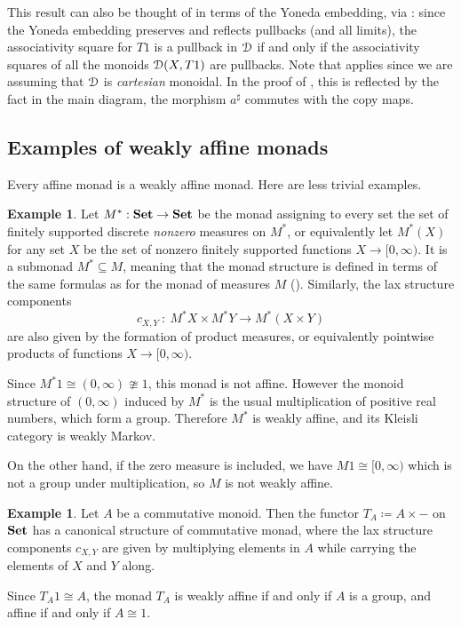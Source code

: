 \documentclass[a4paper,UKenglish,numberwithinsect,cleveref, autoref, thm-restate]{lipics-v2021}
\theoremstyle{plain} %
\theoremstyle{definition} %
\newtheorem{myexample}[mytheorem]{Example}
\begin{document}
This result can also be thought of in terms of the Yoneda embedding, via : since the Yoneda embedding preserves and reflects pullbacks (and all limits), the associativity square for $T1$ is a pullback in $\mathcal{D}$ if and only if the associativity squares of all the monoids $\mathcal{D}(X,T1)$ are pullbacks.
Note that  applies since we are assuming that $\mathcal{D}$ is \emph{cartesian} monoidal. In the proof of , this is reflected by the fact in the main diagram, the morphism $a^\sharp$ commutes with the copy maps. 


\subsection{Examples of weakly affine monads} 
\label{secexamples}

Every affine monad is a weakly affine monad. Here are less trivial examples.

\begin{myexample}
    \label{ex:nonzero_measures}
	Let $M^* : \mathbf{Set} \to \mathbf{Set}$ be the monad assigning to every set the set of finitely supported discrete \emph{nonzero}
	measures on $M^*$, or equivalently let $M^*(X)$ for any set $X$ be the set of nonzero finitely supported functions $X \to [0,\infty)$.
	It is a submonad $M^* \subseteq M$, meaning that the monad structure is defined in terms of the same formulas as for the monad of measures $M$ ().
	Similarly, the lax structure components
	\[
		c_{X,Y} \: : \: M^* X \times M^* Y \longrightarrow M^*(X \times Y)
	\]
	are also given by the formation of product measures, or equivalently pointwise products of functions 
	$X \to [0,\infty)$.

	Since $M^* 1 \cong (0,\infty)\ncong 1$, this monad is not affine. However the monoid structure of $(0,\infty)$ induced by $M^*$ is the usual multiplication of positive real numbers, which form a group. Therefore $M^*$ is weakly affine, and its Kleisli category is weakly Markov.

	On the other hand, if the zero measure is included, we have $M1 \cong [0,\infty)$ which is not a group under multiplication, so $M$ is not weakly affine.
\end{myexample}

\begin{myexample}
	\label{ex:abelian_group}
	Let $A$ be a commutative monoid.
	Then the functor $T_A \coloneqq A \times -$ on $\mathbf{Set}$ has a canonical structure of commutative monad, 
	where the lax structure components $c_{X,Y}$ are given by multiplying elements in $A$ while carrying the elements 
	of $X$ and $Y$ along.

	Since $T_A 1 \cong A$, the monad $T_A$ is weakly affine if and only if $A$ is a group, and affine if and only if $A\cong 1$.
\end{myexample}
\end{document}

